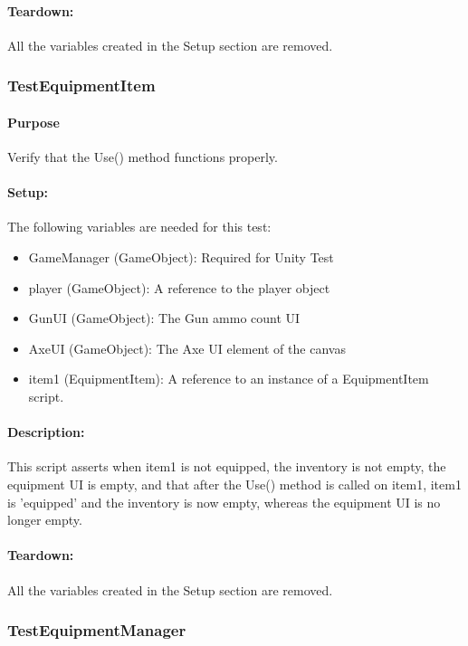 \documentclass[12pt, titlepage]{article}
\begin{document}
{\paragraph{Teardown: } All the variables created in the Setup section are removed.


\subsubsection{Test\textunderscore EquipmentItem}

\paragraph{Purpose} Verify that the Use() method functions properly.

\paragraph{Setup: } The following variables are needed for this test:
\begin{itemize}
	\item GameManager (GameObject): Required for Unity Test
	\item  player (GameObject): A reference to the player object
	\item  GunUI (GameObject): The Gun ammo count UI
	\item AxeUI (GameObject): The Axe UI element of the canvas
	\item item1 (EquipmentItem): A reference to an instance of a EquipmentItem script.
	
\end{itemize}
\paragraph{Description: }
This script asserts when item1 is not equipped, the inventory is not empty, the equipment UI is empty, and that after the Use() method is called on item1, item1 is 'equipped' and the inventory is now empty, whereas the equipment UI is no longer empty.
 
\paragraph{Teardown: } All the variables created in the Setup section are removed.


\subsubsection{Test\textunderscore EquipmentManager}

}
\end{document}
